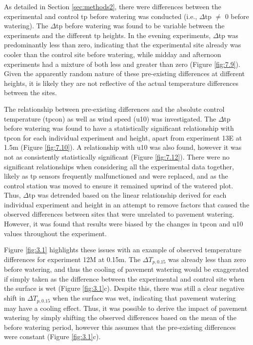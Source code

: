 \documentclass[final,3p,times,authoryear]{elsarticle}
\begin{document}
As detailed in Section \ref{sec:methods2}, there were differences between the experimental and control \gls{tp} before watering was conducted (i.e., $\Delta$\gls{tp} $\neq$ 0 before watering). The $\Delta$\gls{tp} before watering was found to be variable between the experiments and the different \gls{tp} heights. In the evening experiments, $\Delta$\gls{tp} was predominantly less than zero, indicating that the experimental site already was cooler than the control site before watering, while midday and afternoon experiments had a mixture of both less and greater than zero (Figure \ref{fig:7.9}). Given the apparently random nature of these pre-existing differences at different heights, it is likely they are not reflective of the actual temperature differences between the sites.

The relationship between pre-existing differences and the absolute control temperature (\gls{tpcon}) as well as wind speed (\gls{u10}) was investigated. The $\Delta$\gls{tp} before watering was found to have a statistically significant relationship with \gls{tpcon} for each individual experiment and height, apart from experiment 13E at 1.5m (Figure \ref{fig:7.10}). A relationship with \gls{u10} was also found, however it was not as consistently statistically significant (Figure \ref{fig:7.12}). There were no significant relationships when considering all the experimental data together, likely as \gls{tp} sensors frequently malfunctioned and were replaced, and as the control station was moved to ensure it remained upwind of the watered plot. Thus, $\Delta$\gls{tp} was detrended based on the linear relationship derived for each individual experiment and height in an attempt to remove factors that caused the observed differences between sites that were unrelated to pavement watering. However, it was found that results were biased by the changes in \gls{tpcon} and \gls{u10} values throughout the experiment.

Figure \ref{fig:3.1} highlights these issues with an example of observed temperature differences for experiment 12M at 0.15m. The $\Delta$$T_{p,0.15}$ was already less than zero before watering, and thus the cooling of pavement watering would be exaggerated if simply taken as the difference between the experimental and control site when the surface is wet (Figure \ref{fig:3.1}c). Despite this, there was still a clear negative shift in $\Delta$$T_{p,0.15}$ when the surface was wet, indicating that pavement watering may have a cooling effect. Thus, it was possible to derive the impact of pavement watering by simply shifting the observed differences based on the mean of the before watering period, however this assumes that the pre-existing differences were constant (Figure \ref{fig:3.1}c).
\end{document}

